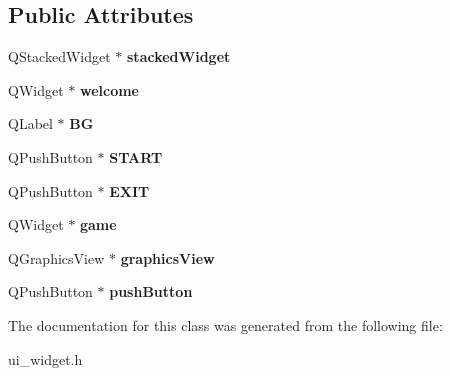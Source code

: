 \subsection*{Public Attributes}
\begin{DoxyCompactItemize}
\item 
\hypertarget{classUi__Widget_ab3f8524a48e84bc0ff069bb0b5df5f77}{Q\-Stacked\-Widget $\ast$ {\bfseries stacked\-Widget}}\label{classUi__Widget_ab3f8524a48e84bc0ff069bb0b5df5f77}

\item 
\hypertarget{classUi__Widget_a09f6fcea73c4bc83c6b94547da0bd00e}{Q\-Widget $\ast$ {\bfseries welcome}}\label{classUi__Widget_a09f6fcea73c4bc83c6b94547da0bd00e}

\item 
\hypertarget{classUi__Widget_a934ad5293e23664ac7860b1a526c46bc}{Q\-Label $\ast$ {\bfseries B\-G}}\label{classUi__Widget_a934ad5293e23664ac7860b1a526c46bc}

\item 
\hypertarget{classUi__Widget_a459a60d23ae04ccf2832346cdb7bbfa6}{Q\-Push\-Button $\ast$ {\bfseries S\-T\-A\-R\-T}}\label{classUi__Widget_a459a60d23ae04ccf2832346cdb7bbfa6}

\item 
\hypertarget{classUi__Widget_a1d0ac3f33786d9a4a641c5a4c5f32918}{Q\-Push\-Button $\ast$ {\bfseries E\-X\-I\-T}}\label{classUi__Widget_a1d0ac3f33786d9a4a641c5a4c5f32918}

\item 
\hypertarget{classUi__Widget_a474f01392a601d6e803d20883051b778}{Q\-Widget $\ast$ {\bfseries game}}\label{classUi__Widget_a474f01392a601d6e803d20883051b778}

\item 
\hypertarget{classUi__Widget_a16341716ac1ccd38cb37d395ccf4e709}{Q\-Graphics\-View $\ast$ {\bfseries graphics\-View}}\label{classUi__Widget_a16341716ac1ccd38cb37d395ccf4e709}

\item 
\hypertarget{classUi__Widget_a7dcf5da8902069415662905e93b0d5cb}{Q\-Push\-Button $\ast$ {\bfseries push\-Button}}\label{classUi__Widget_a7dcf5da8902069415662905e93b0d5cb}

\end{DoxyCompactItemize}


The documentation for this class was generated from the following file\-:\begin{DoxyCompactItemize}
\item 
ui\-\_\-widget.\-h\end{DoxyCompactItemize}
